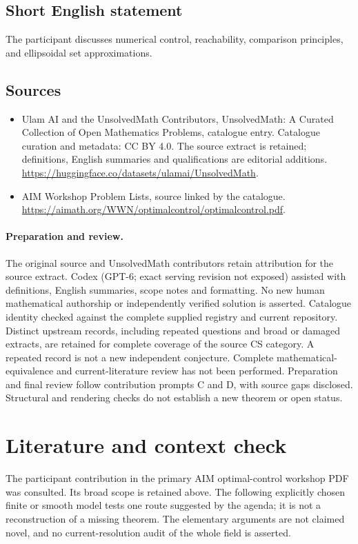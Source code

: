 \documentclass[11pt]{article}
\begin{document}
\subsection{Short English statement}
The participant discusses numerical control, reachability, comparison principles, and ellipsoidal set approximations.
\subsection{Sources}
\begin{itemize}
\item[S1] Ulam AI and the UnsolvedMath Contributors, UnsolvedMath: A Curated Collection of Open Mathematics Problems, catalogue entry. Catalogue curation and metadata: CC BY 4.0. The source extract is retained; definitions, English summaries and qualifications are editorial additions.
\url{https://huggingface.co/datasets/ulamai/UnsolvedMath}.
\item[S2] AIM Workshop Problem Lists, source linked by the catalogue.
\url{https://aimath.org/WWN/optimalcontrol/optimalcontrol.pdf}.
\end{itemize}
\paragraph{Preparation and review.}
The original source and UnsolvedMath contributors retain attribution for the source extract. Codex (GPT-6; exact serving revision not exposed) assisted with definitions, English summaries, scope notes and formatting. No new human mathematical authorship or independently verified solution is asserted. Catalogue identity checked against the complete supplied registry and current repository. Distinct upstream records, including repeated questions and broad or damaged extracts, are retained for complete coverage of the source CS category. A repeated record is not a new independent conjecture. Complete mathematical-equivalence and current-literature review has not been performed. Preparation and final review follow contribution prompts C and D, with source gaps disclosed. Structural and rendering checks do not establish a new theorem or open status.
\label{end:statement}

\section{Literature and context check}
The participant contribution in the primary AIM optimal-control workshop
 PDF was consulted. Its broad scope is retained above. The following explicitly
 chosen finite or smooth model tests one route suggested by the agenda; it is
 not a reconstruction of a missing theorem. The elementary arguments are not
 claimed novel, and no current-resolution audit of the whole field is asserted.
\end{document}
